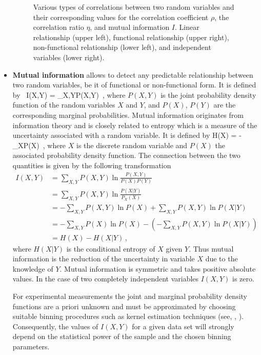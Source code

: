 \begin{itemize}
\begin{figure}[t]
\begin{center}
\end{center}
  \vspace{-0.7cm}
  \caption{Various types of correlations between two random variables
    and their corresponding values for the correlation coefficient
    $\rho$, the correlation ratio $\eta$, and mutual information
    $I$. Linear relationship (upper left), functional relationship
    (upper right), non-functional relationship (lower left), and
    independent variables (lower right).}
  \label{fig:correlationTypes}
\end{figure}
\item {\bf Mutual information} allows to detect any predictable
  relationship between two random variables, be it of functional or
  non-functional form. It is defined by~\cite{citeulike:165404}
      \beq
      \label{eqn:MI}
         I(X,Y) = \sum_{X,Y}P(X,Y) \ln {}\,, 
      \eeq
         where $P(X,Y)$ is the joint probability density function of
         the random variables $X$ and $Y$, and $P(X)$, $P(Y)$ are the
         corresponding marginal probabilities. Mutual information
         originates from information theory and is closely related to
         entropy which is a measure of the uncertainty associated with
         a random variable. It is defined by 
      \beq
      \label{eqn:MIH}
         H(X) = - \sum_{X}P(X) \,, 
         \eeq 
         where $X$ is the
         discrete random variable and $P(X)$ the associated
         probability density function.  The connection between the two
         quantities is given by the following transformation
      \begin{align}
         I(X,Y) &= \sum_{X,Y}P(X,Y) \ln \frac{P(X,Y)}{P(X) P(Y)}\\
           &= \sum_{X,Y}P(X,Y) \ln \frac{P(X|Y)}{P_X(X)}\\
           &= -\sum_{X,Y}P(X,Y) \ln P(X) + \sum_{X,Y}P(X,Y) \ln P(X|Y)\\
           &= -\sum_{X,Y}P(X) \ln P(X) - (-\sum_{X,Y}P(X,Y) \ln P(X|Y) ) \\
           &=H(X) - H(X|Y)\,,	   	
      \end{align}
      where $H(X|Y)$ is the conditional entropy of $X$ given $Y$. Thus
      mutual information is the reduction of the uncertainty in
      variable $X$ due to the knowledge of $Y$. Mutual information is
      symmetric and takes positive absolute values. In the case of two
      completely independent variables $I(X,Y)$ is zero.
      
      For experimental measurements the joint and marginal probability
      density functions are a priori unknown and must be approximated
      by choosing suitable binning procedures such as kernel
      estimation techniques (see, \eg,
      \cite{PhysRevE.52.2318}). Consequently, the values of $I(X,Y)$
      for a given data set will strongly depend on the statistical
      power of the sample and the chosen binning parameters.
      

\end{itemize}
